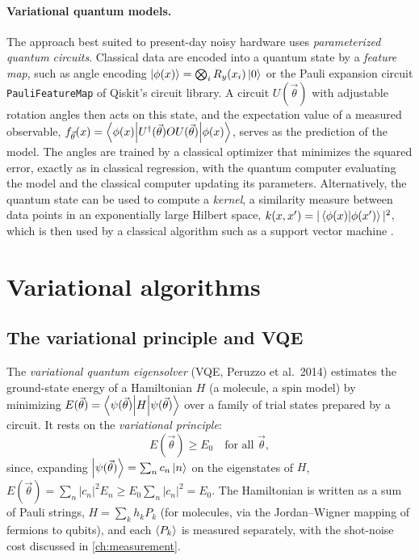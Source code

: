 \paragraph{Variational quantum models.} The approach best suited to present-day noisy hardware uses \emph{parameterized quantum circuits}. Classical data are encoded into a quantum state by a \emph{feature map}, such as angle encoding
$\left|\phi(x)\right\rangle=\bigotimes_iR_y(x_i)\left|0\right\rangle$ or the Pauli expansion circuit \texttt{PauliFeatureMap} of Qiskit's circuit library. A circuit $U(\vec\theta)$ with adjustable rotation angles then acts on this state, and the expectation value
of a measured observable, $f_{\vec\theta}(x)=\left\langle\phi(x)\middle|U^\dagger(\vec\theta)OU(\vec\theta)\middle|\phi(x)\right\rangle$, serves as the prediction of the model. The angles are trained by a classical optimizer that minimizes the squared error, exactly
as in classical regression, with the quantum computer evaluating the model and the classical computer updating its parameters. Alternatively, the quantum state can be used to compute a \emph{kernel}, a similarity measure between data points in
an exponentially large Hilbert space, $k(x,x')=|\left\langle\phi(x)\middle|\phi(x')\right\rangle|^2$, which is then used by a classical algorithm such as a support vector machine \cite{Havlicek2019}.

\section{Variational algorithms}
\subsection{The variational principle and VQE}
The \emph{variational quantum eigensolver} (VQE, Peruzzo et al.\ 2014) estimates the ground-state energy of a Hamiltonian $H$ (a molecule, a spin model) by minimizing $E(\vec\theta)=\left\langle\psi(\vec\theta)\middle|H\middle|\psi(\vec\theta)\right\rangle$ over a family of
trial states prepared by a circuit. It rests on the \emph{variational principle}:
\begin{equation}
  E(\vec\theta)\ge E_0\quad\text{for all }\vec\theta,
\end{equation}
since, expanding $\left|\psi(\vec\theta)\right\rangle=\sum_nc_n\left|n\right\rangle$ on the eigenstates of $H$, $E(\vec\theta)=\sum_n|c_n|^2E_n\ge E_0\sum_n|c_n|^2=E_0$. The Hamiltonian is written as a sum of Pauli strings, $H=\sum_kh_kP_k$ (for molecules, via the
Jordan--Wigner mapping of fermions to qubits), and each $\left\langle P_k\right\rangle$ is measured separately, with the shot-noise cost discussed in \cref{ch:measurement}.

